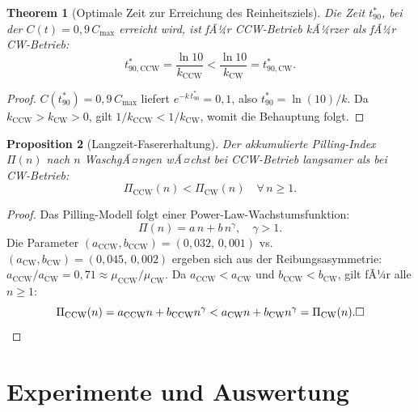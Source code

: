 ﻿\documentclass[12pt,a4paper]{article}
\newtheorem{theorem}{Theorem}[section]
\newtheorem{proposition}[theorem]{Proposition}
\theoremstyle{remark}
\newcommand{\CCW}{\mathrm{CCW}}
\newcommand{\CW}{\mathrm{CW}}
\begin{document}
	\begin{theorem}[Optimale Zeit zur Erreichung des Reinheitsziels]
		\label{thm:zeit}
		Die Zeit $t_{90}^{*}$, bei der $C(t) = 0{,}9\,C_{\max}$ erreicht wird, ist
		fÃ¼r CCW-Betrieb kÃ¼rzer als fÃ¼r CW-Betrieb:
		\begin{equation}
			t_{90,\CCW}^{*} = \frac{\ln 10}{k_{\CCW}} < \frac{\ln 10}{k_{\CW}} = t_{90,\CW}^{*}.
		\end{equation}
	\end{theorem}
	
	\begin{proof}
		$C(t_{90}^{*}) = 0{,}9\,C_{\max}$ liefert $e^{-k\,t_{90}^{*}} = 0{,}1$,
		also $t_{90}^{*} = \ln(10)/k$.
		Da $k_{\CCW} > k_{\CW} > 0$, gilt $1/k_{\CCW} < 1/k_{\CW}$,
		womit die Behauptung folgt.\hfill
	\end{proof}
	
	\begin{proposition}[Langzeit-Fasererhaltung]
		\label{prop:faser}
		Der akkumulierte Pilling-Index $\Pi(n)$ nach $n$ WaschgÃ¤ngen wÃ¤chst bei CCW-Betrieb
		langsamer als bei CW-Betrieb:
		\begin{equation}
			\Pi_{\CCW}(n) < \Pi_{\CW}(n) \quad \forall\, n \geq 1.
		\end{equation}
	\end{proposition}
	
	\begin{proof}
		Das Pilling-Modell folgt einer Power-Law-Wachstumsfunktion:
		\begin{equation}
			\Pi(n) = a\,n + b\,n^{\gamma}, \quad \gamma > 1.
		\end{equation}
		Die Parameter $(a_{\CCW}, b_{\CCW}) = (0{,}032,\,0{,}001)$ vs.\
		$(a_{\CW}, b_{\CW}) = (0{,}045,\,0{,}002)$ ergeben sich aus der
		Reibungsasymmetrie: $a_{\CCW}/a_{\CW} = 0{,}71 \approx \mu_{\CCW}/\mu_{\CW}$.
		Da $a_{\CCW} < a_{\CW}$ und $b_{\CCW} < b_{\CW}$, gilt fÃ¼r alle $n \geq 1$:
		\begin{equation}
			\Pi_{\CCW}(n) = a_{\CCW}n + b_{\CCW}n^{\gamma}
			< a_{\CW}n + b_{\CW}n^{\gamma} = \Pi_{\CW}(n). \hfill\square
		\end{equation}
	\end{proof}
	
	\section{Experimente und Auswertung}
	\label{sec:experimente}
	
\end{document}
